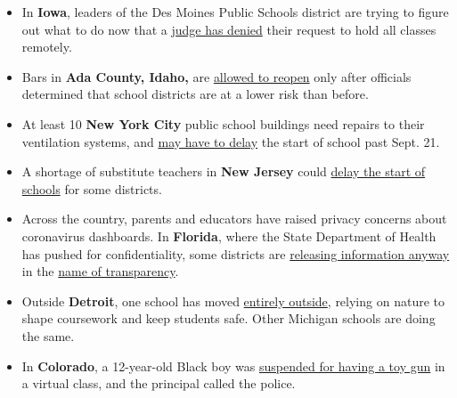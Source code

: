 \begin{itemize}
\item
  In \textbf{Iowa}, leaders of the Des Moines Public Schools district
  are trying to figure out what to do now that a
  \href{https://www.desmoinesregister.com/story/news/2020/09/08/des-moines-public-schools-dmps-injunction-denied-judge-must-hold-in-person-classes-covid-coronavirus/5743788002/}{judge
  has denied} their request to hold all classes remotely.
\item
  Bars in \textbf{Ada County, Idaho,} are
  \href{https://www.kivitv.com/news/bars-allowed-to-reopen-as-ada-county-school-districts-shift-to-category-2}{allowed
  to reopen} only after officials determined that school districts are
  at a lower risk than before.
\item
  At least 10 \textbf{New York City} public school buildings need
  repairs to their ventilation systems, and
  \href{https://patch.com/new-york/new-york-city/these-nyc-schools-reopenings-will-be-delayed-over-ventilation}{may
  have to delay} the start of school past Sept. 21.
\item
  A shortage of substitute teachers in \textbf{New Jersey} could
  \href{https://www.njherald.com/news/20200906/shortage-of-substitute-teachers-could-delay-reopenings-for-many-nj-districts}{delay
  the start of schools} for some districts.
\item
  Across the country, parents and educators have raised privacy concerns
  about coronavirus dashboards. In \textbf{Florida}, where the State
  Department of Health has pushed for confidentiality, some districts
  are
  \href{https://www.tampabay.com/news/gradebook/2020/09/08/schools-create-coronavirus-dashboards-despite-state-privacy-claims/}{releasing
  information anyway} in the
  \href{https://www.bradenton.com/news/coronavirus/article245461660.html}{name
  of transparency}.
\item
  Outside \textbf{Detroit}, one school has moved
  \href{https://www.detroitnews.com/story/news/education/2020/09/08/covid-19-schools-outdoors/5471161002/}{entirely
  outside}, relying on nature to shape coursework and keep students
  safe. Other Michigan schools are doing the same.
\item
  In \textbf{Colorado}, a 12-year-old Black boy was
  \href{https://kdvr.com/news/problem-solvers/12-year-old-suspended-over-toy-gun-seen-in-virtual-class/?fbclid=IwAR1iLrrHO6Fd_eVn4A76dVrfcV6icJ3wEFKs0CkkrDTE4Wp3aSzq0BO6qtE}{suspended
  for having a toy gun} in a virtual class, and the principal called the
  police.
\end{itemize}

